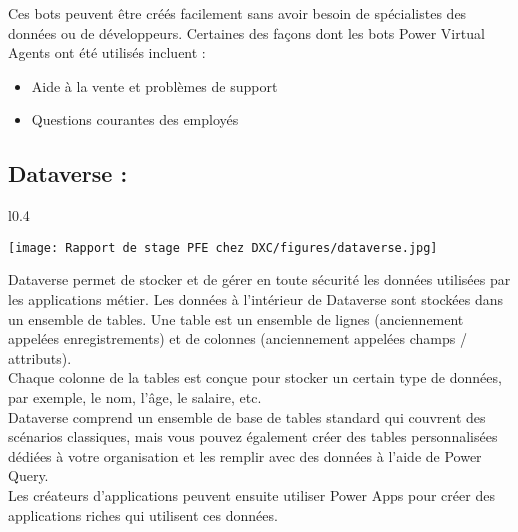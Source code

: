 Ces bots peuvent être créés facilement sans avoir besoin de spécialistes des données ou de développeurs. Certaines des façons dont les bots Power Virtual Agents ont été utilisés incluent :

\begin{itemize}
  \item Aide à la vente et problèmes de support
  \item Questions courantes des employés
\end{itemize}

\newpage
\subsection{Dataverse :}

\begin{wrapfigure}{l}{0.4\textwidth}
  \begin{center}
    \texttt{[image: Rapport de stage PFE chez DXC/figures/dataverse.jpg]}
  \end{center}
\end{wrapfigure}

Dataverse permet de stocker et de gérer en toute sécurité les données utilisées par les applications métier. Les données à l’intérieur de Dataverse sont stockées dans un ensemble de tables. Une table est un ensemble de lignes (anciennement appelées enregistrements) et de colonnes (anciennement appelées champs / attributs). 
\\
Chaque colonne de la tables est conçue pour stocker un certain type de données, par exemple, le nom, l’âge, le salaire, etc. 
\\
Dataverse comprend un ensemble de base de tables standard qui couvrent des scénarios classiques, mais vous pouvez également créer des tables personnalisées dédiées à votre organisation et les remplir avec des données à l’aide de Power Query. 
\\
Les créateurs d’applications peuvent ensuite utiliser Power Apps pour créer des applications riches qui utilisent ces données.

